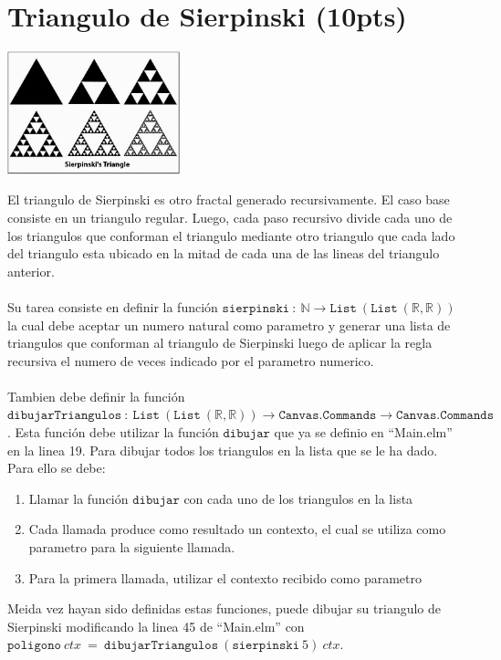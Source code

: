 \documentclass{article}
\begin{document}
\section*{Triangulo de Sierpinski (10pts)}
\begin{center}
        \includegraphics[width=5cm]{include/sierpinski.jpg}
\end{center}
El triangulo de Sierpinski es otro fractal generado recursivamente. El caso base consiste
en un triangulo regular. Luego, cada paso recursivo divide cada uno de los triangulos que
conforman el triangulo mediante otro triangulo que cada lado del triangulo esta ubicado en
la mitad de cada una de las lineas del triangulo anterior.
\\\\
Su tarea consiste en definir la funci\'on $\mathtt{sierpinski}\ :\ \mathbb{N}\rightarrow \mathtt{List}\ 
(\mathtt{List}\ (\mathbb{R}, \mathbb{R}))$ la cual debe aceptar un numero natural como parametro y generar
una lista de triangulos que conforman al triangulo de Sierpinski luego de aplicar la regla recursiva el
numero de veces indicado por el parametro numerico.
\\\\
Tambien debe definir la funci\'on $\mathtt{dibujarTriangulos}\ :\ \mathtt{List}\ (\mathtt{List}\ (\mathbb{R}, \mathbb{R}))
\rightarrow \mathtt{Canvas.Commands}\rightarrow\mathtt{Canvas.Commands}$. Esta funci\'on debe utilizar
la funci\'on $\mathtt{dibujar}$ que ya se definio en ``Main.elm'' en la linea 19. Para dibujar todos
los triangulos en la lista que se le ha dado. Para ello se debe:
\begin{enumerate}
        \item{Llamar la funci\'on $\mathtt{dibujar}$ con cada uno de los triangulos en la lista}
        \item{Cada llamada produce como resultado un contexto, el cual se utiliza como
        parametro para la siguiente llamada.}
        \item{Para la primera llamada, utilizar el contexto recibido como parametro}
\end{enumerate}
Meida vez hayan sido definidas estas funciones, puede dibujar su triangulo de Sierpinski modificando
la linea 45 de ``Main.elm'' con $\mathtt{poligono}\ ctx\ =\ \mathtt{dibujarTriangulos}\ 
(\mathtt{sierpinski}\ 5)\ ctx$.
\end{document}

